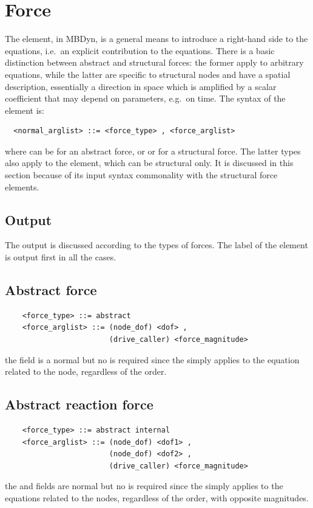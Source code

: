 \section{Force}\label{sec:EL:FORCE}
The  element, in MBDyn, is a general means to introduce 
a right-hand side to the equations, i.e.\ an explicit contribution
to the equations.
There is a basic distinction between abstract and structural forces:
the former apply to arbitrary equations, while the latter are specific
to structural nodes and have a spatial description, essentially
a direction in space which is amplified by a scalar coefficient
that may depend on parameters, e.g.\ on time.
The syntax of the  element is:
\begin{verbatim}
  <normal_arglist> ::= <force_type> , <force_arglist>
\end{verbatim}
where  can be  for an abstract force, or 
 or  for a structural force.
The latter types also apply to the  element,
which can be structural only.
It is discussed in this section because of its input syntax commonality 
with the structural force elements.

\subsection{Output}
The output is discussed according to the types of forces. 
The label of the element is output first in all the cases.

\subsection{Abstract force}
\begin{verbatim}
    <force_type> ::= abstract 
    <force_arglist> ::= (node_dof) <dof> ,
                        (drive_caller) <force_magnitude>
\end{verbatim}
the  field is a normal  but no  is required
since the  simply applies to the equation related to the node,
regardless of the order.

\subsection{Abstract reaction force}
\begin{verbatim}
    <force_type> ::= abstract internal
    <force_arglist> ::= (node_dof) <dof1> ,
                        (node_dof) <dof2> ,
                        (drive_caller) <force_magnitude>
\end{verbatim}
the  and  fields are normal 
but no  is required since the  simply applies
to the equations related to the nodes, regardless of the order, with
opposite magnitudes.

